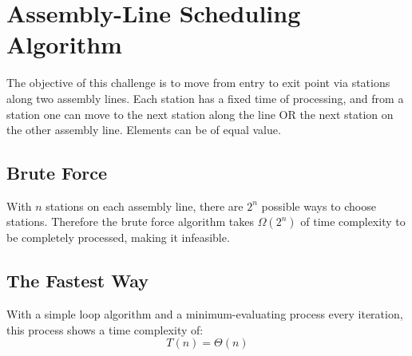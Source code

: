 \chapter{Assembly-Line Scheduling Algorithm}
The objective of this challenge is to move from entry to exit point via stations
along two assembly lines. Each station has a fixed time of processing, and from
a station one can move to the next station along the line OR the next station on
the other assembly line. Elements can be of equal value.

\section{Brute Force}
With $n$ stations on each assembly line, there are $2^n$ possible ways to choose
stations. Therefore the brute force algorithm takes $\Omega\left(2^n\right)$ of
time complexity to be completely processed, making it infeasible.

\section{The Fastest Way}
With a simple loop algorithm and a minimum-evaluating process every iteration,
this process shows a time complexity of: \[ T(n)=\Theta(n) \]
